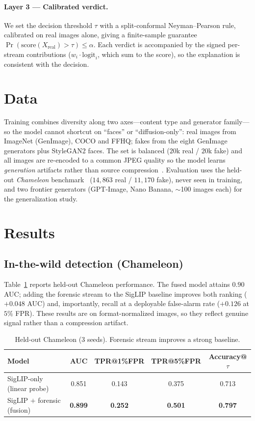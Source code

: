 \documentclass[11pt]{article}
\begin{document}
\paragraph{Layer 3 --- Calibrated verdict.} We set the decision threshold $\tau$ with a
split-conformal Neyman--Pearson rule, calibrated on real images alone, giving a
finite-sample guarantee $\Pr(\text{score}(X_{\text{real}}) > \tau) \le \alpha$. Each
verdict is accompanied by the signed per-stream contributions ($w_i \cdot \text{logit}_i$,
which sum to the score), so the explanation is consistent with the decision.

\section{Data}
Training combines diversity along two axes---content type and generator family---so the
model cannot shortcut on ``faces'' or ``diffusion-only'': real images from ImageNet
(GenImage), COCO and FFHQ; fakes from the eight GenImage generators plus StyleGAN2
faces. The set is balanced ($20$k real / $20$k fake) and all images are re-encoded to a
common JPEG quality so the model learns \emph{generation} artifacts rather than source
compression~\cite{fakeorjpeg}. Evaluation uses the held-out \emph{Chameleon}
benchmark~\cite{aide} ($14{,}863$ real / $11{,}170$ fake), never seen in training, and
two frontier generators (GPT-Image, Nano Banana, $\sim$100 images each) for the
generalization study.

\section{Results}

\subsection{In-the-wild detection (Chameleon)}
Table~\ref{tab:chameleon} reports held-out Chameleon performance. The fused model
attains $0.90$ AUC; adding the forensic stream to the SigLIP baseline improves both
ranking ($+0.048$ AUC) and, importantly, recall at a deployable false-alarm rate
($+0.126$ at $5\%$ FPR). These results are on format-normalized images, so they reflect
genuine signal rather than a compression artifact.

\begin{table}[h]
\centering
\caption{Held-out Chameleon (3 seeds). Forensic stream improves a strong baseline.}
\label{tab:chameleon}
\begin{tabular}{lcccc}
\toprule
Model & AUC & TPR@1\%FPR & TPR@5\%FPR & Accuracy@$\tau$ \\
\midrule
SigLIP-only (linear probe) & 0.851 & 0.143 & 0.375 & 0.713 \\
SigLIP $+$ forensic (fusion) & \textbf{0.899} & \textbf{0.252} & \textbf{0.501} & \textbf{0.797} \\
\bottomrule
\end{tabular}
\end{table}
\end{document}
